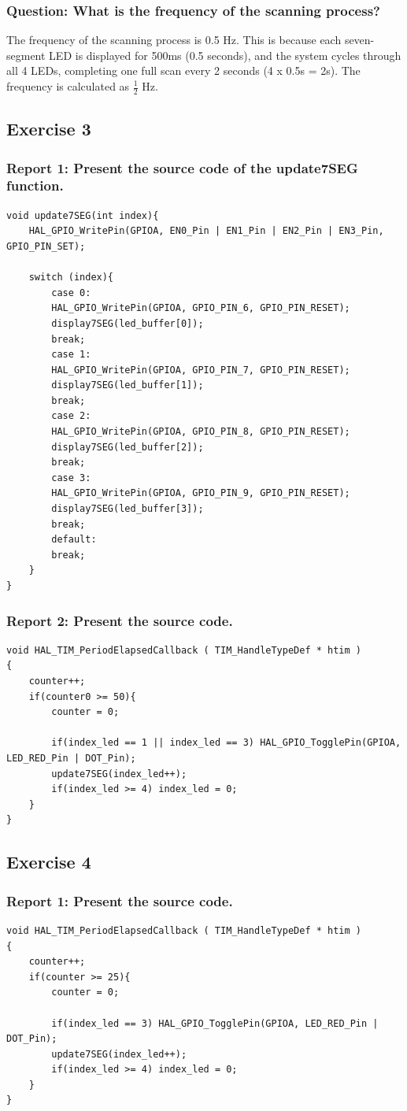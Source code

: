 \documentclass[a4paper,12pt]{article}
\begin{document}
\subsubsection{Question: What is the frequency of the scanning process?}

The frequency of the scanning process is 0.5 Hz. This is because each seven-segment LED is displayed for 500ms (0.5 seconds), and the system cycles through all 4 LEDs, completing one full scan every 2 seconds (4 x 0.5s = 2s). The frequency is calculated as $ \frac{1}{2} $ Hz.
\subsection{Exercise 3}
\subsubsection{Report 1: Present the source code of the update7SEG function.}
\begin{lstlisting}
void update7SEG(int index){
	HAL_GPIO_WritePin(GPIOA, EN0_Pin | EN1_Pin | EN2_Pin | EN3_Pin, GPIO_PIN_SET);
	
	switch (index){
		case 0:
		HAL_GPIO_WritePin(GPIOA, GPIO_PIN_6, GPIO_PIN_RESET);
		display7SEG(led_buffer[0]);
		break;
		case 1:
		HAL_GPIO_WritePin(GPIOA, GPIO_PIN_7, GPIO_PIN_RESET);
		display7SEG(led_buffer[1]);
		break;
		case 2:
		HAL_GPIO_WritePin(GPIOA, GPIO_PIN_8, GPIO_PIN_RESET);
		display7SEG(led_buffer[2]);
		break;
		case 3:
		HAL_GPIO_WritePin(GPIOA, GPIO_PIN_9, GPIO_PIN_RESET);
		display7SEG(led_buffer[3]);
		break;
		default:
		break;
	}
}
\end{lstlisting}
\subsubsection{Report 2: Present the source code.}
\begin{lstlisting}
void HAL_TIM_PeriodElapsedCallback ( TIM_HandleTypeDef * htim )
{
	counter++;
	if(counter0 >= 50){
		counter = 0;
		
		if(index_led == 1 || index_led == 3) HAL_GPIO_TogglePin(GPIOA, LED_RED_Pin | DOT_Pin);
		update7SEG(index_led++);
		if(index_led >= 4) index_led = 0;
	}
}
\end{lstlisting}
\subsection{Exercise 4}
\subsubsection{Report 1: Present the source code.}
\begin{lstlisting}
void HAL_TIM_PeriodElapsedCallback ( TIM_HandleTypeDef * htim )
{
	counter++;
	if(counter >= 25){
		counter = 0;
		
		if(index_led == 3) HAL_GPIO_TogglePin(GPIOA, LED_RED_Pin | DOT_Pin);
		update7SEG(index_led++);
		if(index_led >= 4) index_led = 0;
	}
}
\end{lstlisting}
\end{document}
